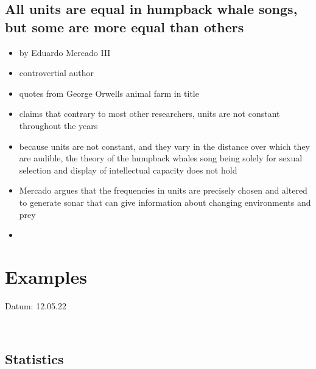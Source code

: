 \documentclass[12pt,a4paper]{article}
\begin{document}
\newpage
\subsection{All units are equal in humpback whale songs, but some are more equal than others} %
\label{sub:all_units_are_equal_in_humpback_whale_songs_but_some_are_more_equal_than_others}
\begin{itemize}
  \item by Eduardo Mercado III \cite{mercado_all_2022}
  \item controvertial author
  \item quotes from George Orwells animal farm in title
  \item claims that contrary to most other researchers, units are not constant throughout the years
  \item because units are not constant, and they vary in the distance over which they are audible, the theory of the humpback whales song being solely for sexual selection and display of intellectual capacity does not hold
  \item Mercado argues that the frequencies in units are precisely chosen and altered to generate sonar that can give information about changing environments and prey
  \item 
\end{itemize}


\newpage
\section{Examples}
\addtocounter{section}{1}
Datum: 12.05.22 \ 

\noindent\hrulefill  \


\subsection{Statistics} %
\label{sub:Statistics}
\end{document}
